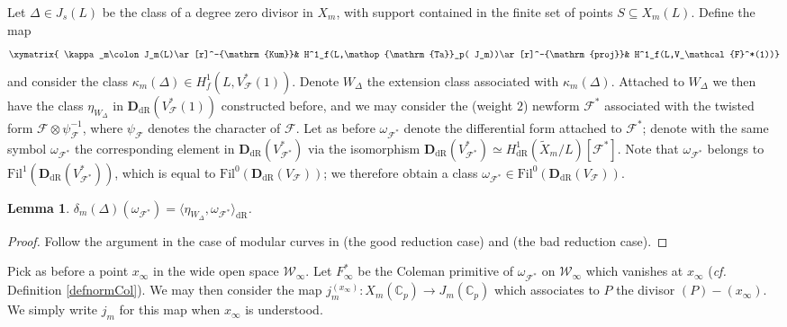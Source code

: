 \documentclass[a4paper,11pt]{amsart}
\numberwithin{equation}{section}
\theoremstyle{plain}
\newtheorem{lemma}[theorem]{Lemma}
\theoremstyle{definition}
\theoremstyle{remark}
\newcommand{\C}{\mathbb C}
\DeclareMathOperator{\Ta}{Ta}
\newcommand{\dR}{\mathrm{dR}}
\begin{document}
Let $\Delta\in J_s(L)$ be the class of a degree zero divisor in ${X}_m$, with support contained in the finite set of points $S\subseteq {X}_m(L)$. Define the map 
\begin{equation}\label{Kummer}
\xymatrix{
\kappa_m\colon J_m(L)\ar[r]^-{\mathrm{Kum}}& H^1_f(L,\Ta_p( J_m))\ar[r]^-{\mathrm{proj}}& 
H^1_f(L,V_\mathcal{F}^*(1))}\end{equation} 
and consider the class $\kappa_m(\Delta)\in H^1_f(L,V_\mathcal{F}^*(1))$. 
Denote $W_\Delta$ the extension class associated with $\kappa_m(\Delta)$. Attached to $W_\Delta$ we then have the class $\eta_{W_\Delta}$ in $\mathbf{D}_\dR(V_\mathcal{F}^*(1))$ constructed before, and we may consider the (weight $2$) newform $\mathcal{F}^*$ associated with the twisted form  
$\mathcal{F}\otimes\psi_\mathcal{F}^{-1}$, where $\psi_\mathcal{F}$ denotes the character of $\mathcal{F}$. Let as before $\omega_{\mathcal{F}^*}$ denote the differential form attached to $\mathcal{F}^*$; denote with the same symbol $\omega_{\mathcal{F}^*}$ the corresponding element in $\mathbf{D}_\dR(V_{\mathcal{F}^*}^*)$ via the isomorphism 
$\mathbf{D}_\dR(V_{\mathcal{F}^*}^*)\simeq H^1_\dR(\widetilde{X}_m/L)[\mathcal{F}^*]$. Note that $\omega_{\mathcal{F}^*}$ belongs to $\mathrm{Fil}^1(\mathbf{D}_\dR(V_{\mathcal{F}^*}^*))$, which is equal to $\mathrm{Fil}^0(\mathbf{D}_\dR(V_{\mathcal{F}}))$; we therefore obtain a class 
$\omega_{\mathcal{F}^*}\in \mathrm{Fil}^0(\mathbf{D}_\dR(V_{\mathcal{F}}))$.

\begin{lemma}\label{Col5}
$\delta_m(\Delta)(\omega_{\mathcal{F}^*})=\langle \eta_{W_\Delta},\omega_{\mathcal{F}^*}\rangle_\dR$.  
\end{lemma}

\begin{proof}
Follow the argument in the case of modular curves in 
\cite[\S4.1]{BDP} (the good reduction case) and \cite[\S2.2]{Castella-MathAnn} (the bad reduction case).  
\end{proof}

Pick as before a point $x_\infty$ in the wide open space ${\mathcal{W}}_\infty$. Let $F_\infty^*$ be the Coleman primitive of $\omega_{\mathcal{F}^*}$ on $\mathcal{W}_\infty$ which vanishes at $x_\infty$ (\emph{cf.} Definition \ref{defnormCol}). 
We may then consider the map $j_m^{(x_\infty)}\colon {X}_m(\C_p)\rightarrow  J_m(\C_p)$ which associates to $P$ the divisor $(P)-(x_\infty)$. We simply write $j_m$ for this map when $x_\infty$ 
is understood. 
 
\end{document}
